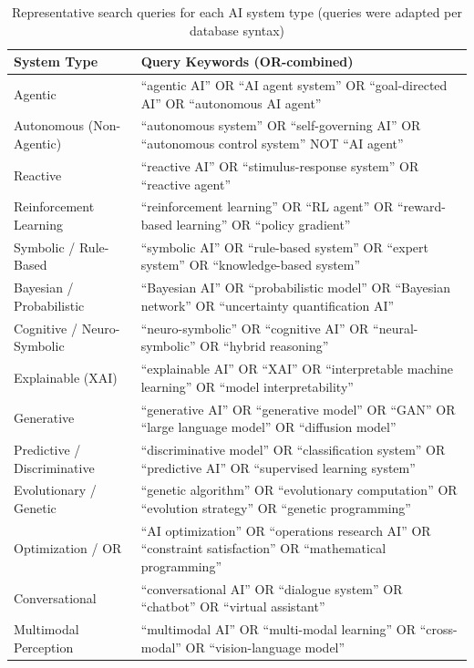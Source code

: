 \documentclass[acmlarge]{acmart}
\begin{document}
\begin{table}[ht]
\caption{Representative search queries for each AI system type (queries were adapted per database syntax)}
\label{tab:search-queries}
\small
\begin{tabular}{@{}lp{10cm}@{}}
\toprule
\textbf{System Type} & \textbf{Query Keywords (OR-combined)} \\
\midrule
Agentic & ``agentic AI'' OR ``AI agent system'' OR ``goal-directed AI'' OR ``autonomous AI agent'' \\
Autonomous (Non-Agentic) & ``autonomous system'' OR ``self-governing AI'' OR ``autonomous control system'' NOT ``AI agent'' \\
Reactive & ``reactive AI'' OR ``stimulus-response system'' OR ``reactive agent'' \\
Reinforcement Learning & ``reinforcement learning'' OR ``RL agent'' OR ``reward-based learning'' OR ``policy gradient'' \\
Symbolic / Rule-Based & ``symbolic AI'' OR ``rule-based system'' OR ``expert system'' OR ``knowledge-based system'' \\
Bayesian / Probabilistic & ``Bayesian AI'' OR ``probabilistic model'' OR ``Bayesian network'' OR ``uncertainty quantification AI'' \\
Cognitive / Neuro-Symbolic & ``neuro-symbolic'' OR ``cognitive AI'' OR ``neural-symbolic'' OR ``hybrid reasoning'' \\
Explainable (XAI) & ``explainable AI'' OR ``XAI'' OR ``interpretable machine learning'' OR ``model interpretability'' \\
Generative & ``generative AI'' OR ``generative model'' OR ``GAN'' OR ``large language model'' OR ``diffusion model'' \\
Predictive / Discriminative & ``discriminative model'' OR ``classification system'' OR ``predictive AI'' OR ``supervised learning system'' \\
Evolutionary / Genetic & ``genetic algorithm'' OR ``evolutionary computation'' OR ``evolution strategy'' OR ``genetic programming'' \\
Optimization / OR & ``AI optimization'' OR ``operations research AI'' OR ``constraint satisfaction'' OR ``mathematical programming'' \\
Conversational & ``conversational AI'' OR ``dialogue system'' OR ``chatbot'' OR ``virtual assistant'' \\
Multimodal Perception & ``multimodal AI'' OR ``multi-modal learning'' OR ``cross-modal'' OR ``vision-language model'' \\

\end{tabular}
\end{table}
\end{document}
